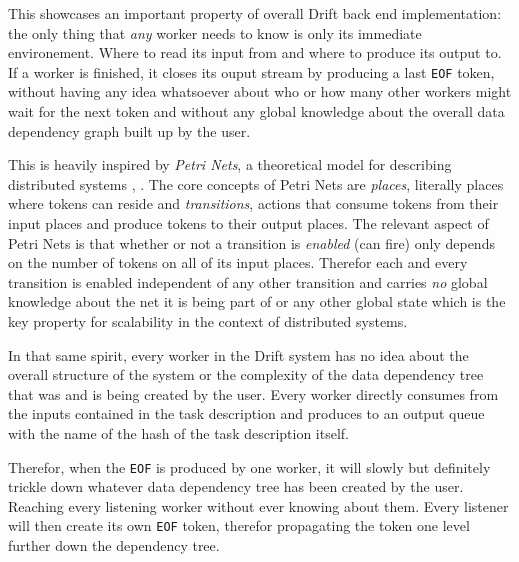 This showcases an important property of overall Drift back end
implementation: the only thing that \textit{any} worker needs
to know is only its immediate environement. Where to read its
input from and where to produce its output to. If a worker
is finished, it closes its ouput stream by producing a last
\texttt{EOF} token, without having any idea whatsoever about
who or how many other workers might wait for the next token
and without any global knowledge about the overall
data dependency graph built up by the user.

This is heavily inspired by \textit{Petri Nets}, a theoretical
model for describing distributed systems \cite{pnbook}, \cite{pnwiki}.
The core concepts of Petri Nets are \textit{places}, literally
places where tokens can reside and \textit{transitions}, actions
that consume tokens from their input places and produce tokens
to their output places. The relevant aspect of Petri Nets is that
whether or not a transition is \textit{enabled} (can fire) only
depends on the number of tokens on all of its input places.
Therefor each and every transition is enabled independent of
any other transition and carries \textit{no} global knowledge about
the net it is being part of or any other global state which is
the key property for scalability in the context of distributed
systems.

In that same spirit, every worker in the Drift system has no
idea about the overall structure of the system or the complexity
of the data dependency tree that was and is being created by the
user. Every worker directly consumes from the inputs contained
in the task description and produces to an output queue with the
name of the hash of the task description itself.

Therefor, when the \texttt{EOF} is produced by one worker, it will
slowly but definitely trickle down whatever data dependency tree
has been created by the user. Reaching every listening worker
without ever knowing about them. Every listener will then create
its own \texttt{EOF} token, therefor propagating the token one
level further down the dependency tree.


